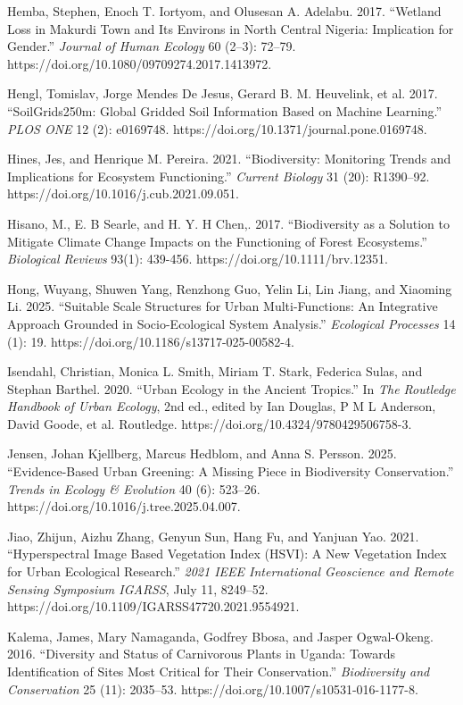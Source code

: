 Hemba, Stephen, Enoch T. Iortyom, and Olusesan A. Adelabu. 2017. ``Wetland Loss in Makurdi Town and Its Environs in North Central Nigeria: Implication for Gender.'' \emph{Journal of Human Ecology} 60 (2--3): 72--79. https://doi.org/10.1080/09709274.2017.1413972.

Hengl, Tomislav, Jorge Mendes De Jesus, Gerard B. M. Heuvelink, et al. 2017. ``SoilGrids250m: Global Gridded Soil Information Based on Machine Learning.'' \emph{PLOS ONE} 12 (2): e0169748. https://doi.org/10.1371/journal.pone.0169748.

Hines, Jes, and Henrique M. Pereira. 2021. ``Biodiversity: Monitoring Trends and Implications for Ecosystem Functioning.'' \emph{Current Biology} 31 (20): R1390--92. https://doi.org/10.1016/j.cub.2021.09.051.

Hisano, M., E. B Searle, and H. Y. H Chen,. 2017. ``Biodiversity as a Solution to Mitigate Climate Change Impacts on the Functioning of Forest Ecosystems.'' \emph{Biological Reviews} 93(1): 439-456. https://doi.org/10.1111/brv.12351.

Hong, Wuyang, Shuwen Yang, Renzhong Guo, Yelin Li, Lin Jiang, and Xiaoming Li. 2025. ``Suitable Scale Structures for Urban Multi-Functions: An Integrative Approach Grounded in Socio-Ecological System Analysis.'' \emph{Ecological Processes} 14 (1): 19. https://doi.org/10.1186/s13717-025-00582-4.

Isendahl, Christian, Monica L. Smith, Miriam T. Stark, Federica Sulas, and Stephan Barthel. 2020. ``Urban Ecology in the Ancient Tropics.'' In \emph{The Routledge Handbook of Urban Ecology}, 2nd ed., edited by Ian Douglas, P M L Anderson, David Goode, et al. Routledge. https://doi.org/10.4324/9780429506758-3.

Jensen, Johan Kjellberg, Marcus Hedblom, and Anna S. Persson. 2025. ``Evidence-Based Urban Greening: A Missing Piece in Biodiversity Conservation.'' \emph{Trends in Ecology \& Evolution} 40 (6): 523--26. https://doi.org/10.1016/j.tree.2025.04.007.

Jiao, Zhijun, Aizhu Zhang, Genyun Sun, Hang Fu, and Yanjuan Yao. 2021. ``Hyperspectral Image Based Vegetation Index (HSVI): A New Vegetation Index for Urban Ecological Research.'' \emph{2021 IEEE International Geoscience and Remote Sensing Symposium IGARSS}, July 11, 8249--52. https://doi.org/10.1109/IGARSS47720.2021.9554921.

Kalema, James, Mary Namaganda, Godfrey Bbosa, and Jasper Ogwal-Okeng. 2016. ``Diversity and Status of Carnivorous Plants in Uganda: Towards Identification of Sites Most Critical for Their Conservation.'' \emph{Biodiversity and Conservation} 25 (11): 2035--53. https://doi.org/10.1007/s10531-016-1177-8.

